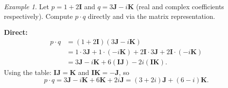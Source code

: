 \documentclass[12pt,a4paper]{article}
\theoremstyle{definition}
\theoremstyle{remark}
\newtheorem{example}[theorem]{Example}
\begin{document}
\begin{example}
  \label{ex:biquat_mult}
  Let $p = 1 + 2\mathbf{I}$ and $q = 3\mathbf{J} - i\mathbf{K}$
  (real and complex coefficients respectively).
  Compute $p\cdot q$ directly and via the matrix representation.

  \medskip
  \noindent\textbf{Direct:}
  \begin{align*}
    p\cdot q
    &= (1 + 2\mathbf{I})(3\mathbf{J} - i\mathbf{K}) \\
    &= 1\cdot3\mathbf{J} + 1\cdot(-i\mathbf{K})
       + 2\mathbf{I}\cdot3\mathbf{J} + 2\mathbf{I}\cdot(-i\mathbf{K}) \\
    &= 3\mathbf{J} - i\mathbf{K}
       + 6(\mathbf{I}\mathbf{J}) - 2i(\mathbf{I}\mathbf{K}).
  \end{align*}
  Using the table: $\mathbf{I}\mathbf{J}=\mathbf{K}$ and
  $\mathbf{I}\mathbf{K}=-\mathbf{J}$, so
  \[
    p\cdot q = 3\mathbf{J} - i\mathbf{K} + 6\mathbf{K} + 2i\mathbf{J}
             = (3+2i)\mathbf{J} + (6-i)\mathbf{K}.
  \]


\end{example}
\end{document}
